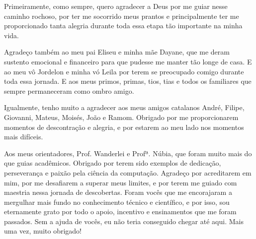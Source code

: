%

Primeiramente, como sempre, quero agradecer a Deus por me guiar nesse caminho rochoso, por ter me socorrido meus prantos e principalmente ter me proporcionado tanta alegria durante toda essa etapa tão importante na minha vida.

Agradeço também ao meu pai Eliseu e minha mãe Dayane, que me deram sustento emocional e financeiro para que pudesse me manter tão longe de casa. 
E ao meu vô Jordelon e minha vó Leila por terem se preocupado comigo durante toda essa jornada.
E aos meus primos, primas, tios, tias e todos os familiares que sempre permaneceram como ombro amigo.

Igualmente, tenho muito a agradecer aos meus amigos catalanos André, Filipe, Giovanni, Mateus, Moisés, João e Ramom.
Obrigado por me proporcionarem momentos de descontração e alegria, e por estarem ao meu lado nos momentos mais difíceis.

Aos meus orientadores, Prof. Wanderlei e Profª. Núbia, que foram muito mais do que guias acadêmicos. 
Obrigado por terem sido exemplos de dedicação, perseverança e paixão pela ciência da computação. 
Agradeço por acreditarem em mim, por me desafiarem a superar meus limites, e por terem me guiado com maestria nessa jornada de descobertas. 
Foram vocês que me encorajaram a mergulhar mais fundo no conhecimento técnico e científico, e por isso, sou eternamente grato por todo o apoio, incentivo e ensinamentos que me foram passados. 
Sem a ajuda de vocês, eu não teria conseguido chegar até aqui. Mais uma vez, muito obrigado!

